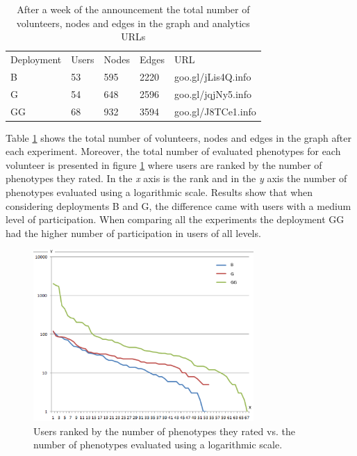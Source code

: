 \begin{table}
  \small
  \caption{After a week of the announcement the total number of volunteers, 
  nodes and edges in the graph and analytics URLs}
  \label{tab:urls} 
  \centering
  \small
  \begin{tabular}{l l l l l}
    \hline\noalign{\smallskip}
     Deployment &  Users &  Nodes &  Edges & URL \\
    \noalign{\smallskip}\hline\noalign{\smallskip}
    B   & 53 &  595   & 2220  & goo.gl/jLis4Q.info \\ \hline
    G   & 54 &  648   & 2596  & goo.gl/jqjNy5.info \\ \hline
    GG  & 68 &  932   & 3594  & goo.gl/J8TCe1.info \\ \hline
    \end{tabular}
\end{table}

Table \ref{tab:urls} shows the total number of volunteers, nodes and edges 
in the graph after each experiment. Moreover, the total number of evaluated 
phenotypes for each volunteer is presented in figure 
\ref{fig:top-ranked-participation} where users are ranked by the 
number of phenotypes they rated. In the \emph{x} axis is the rank and in the \emph{y} axis 
the number of phenotypes evaluated using a logarithmic scale. Results show that when 
considering deployments B and G, the difference came with users with a medium level of participation.
When comparing all the experiments the deployment GG had the higher number of participation in users of all levels.    

\begin{figure}[!t]
    \centering
        \includegraphics[width=3.3in]{img/comparison.png}
    \caption{Users ranked by the number of phenotypes they rated vs. the number of phenotypes evaluated using a logarithmic scale. }
    \label{fig:top-ranked-participation}
\end{figure}

